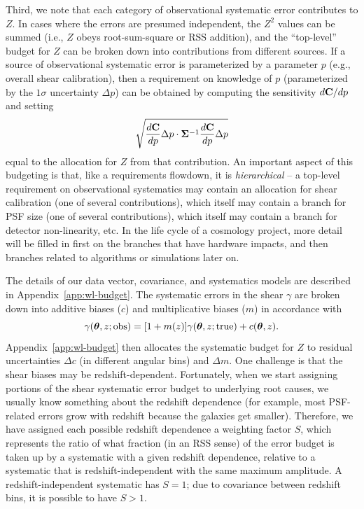 \documentclass[usenatbib]{mnras}
\begin{document}
Third, we note that each category of observational systematic error contributes to $Z$. In cases where the errors are presumed independent, the $Z^2$ values can be summed (i.e., $Z$ obeys root-sum-square or RSS addition), and the ``top-level'' budget for $Z$ can be broken down into contributions from different sources. If a source of observational systematic error is parameterized by a parameter $p$ (e.g., overall shear calibration), then a requirement on knowledge of $p$ (parameterized by the $1\sigma$ uncertainty $\Delta p$) can be obtained by computing the sensitivity $d{\bf C}/dp$ and setting
\begin{equation}
\sqrt{\frac{d{\bf C}}{dp} \Delta p \cdot {\boldsymbol\Sigma}^{-1} \frac{d{\bf C}}{dp} \Delta p}
\end{equation}
equal to the allocation for $Z$ from that contribution. An important aspect of this budgeting is that, like a requirements flowdown, it is {\em hierarchical} -- a top-level requirement on observational systematics may contain an allocation for shear calibration (one of several contributions), which itself may contain a branch for PSF size (one of several contributions), which itself may contain a branch for detector non-linearity, etc. In the life cycle of a cosmology project, more detail will be filled in first on the branches that have hardware impacts, and then branches related to algorithms or simulations later on.

The details of our data vector, covariance, and systematics models are described in Appendix~\ref{app:wl-budget}. The systematic errors in the shear $\gamma$ are broken down into additive biases ($c$) and multiplicative biases ($m$) in accordance with
\begin{equation}
\gamma({\boldsymbol\theta},z;{\rm obs}) = [1+m(z)] \gamma({\boldsymbol\theta},z;{\rm true}) + c({\boldsymbol\theta},z).
\label{eq:gmod}
\end{equation}
Appendix~\ref{app:wl-budget} then allocates the systematic budget for $Z$ to residual uncertainties $\Delta c$ (in different angular bins) and $\Delta m$. One challenge is that the shear biases may be redshift-dependent. Fortunately, when we start assigning portions of the shear systematic error budget to underlying root causes, we usually know something about the redshift dependence (for example, most PSF-related errors grow with redshift because the galaxies get smaller). Therefore, we have assigned each possible redshift dependence a weighting factor $S$, which represents the ratio of what fraction (in an RSS sense) of the error budget is taken up by a systematic with a given redshift dependence, relative to a systematic that is redshift-independent with the same maximum amplitude. A redshift-independent systematic has $S=1$; due to covariance between redshift bins, it is possible to have $S>1$.
\end{document}
